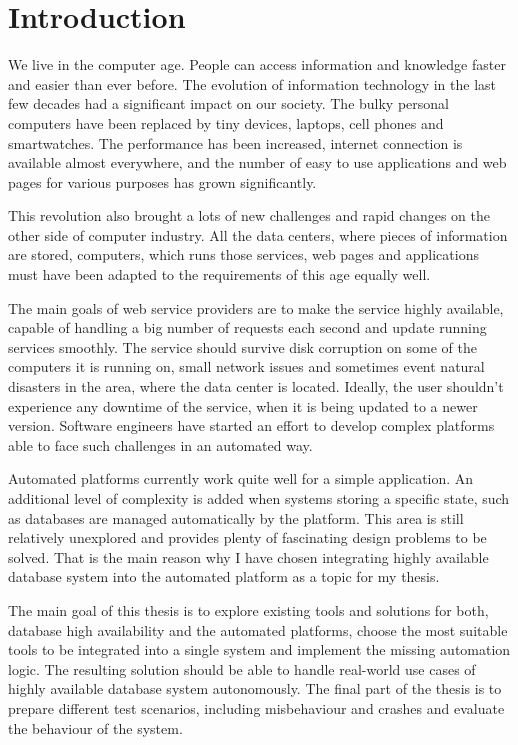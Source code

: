 \documentclass[
  digital, %
  twoside, %
  table,   %
  lof,     %
  lot,     %
]{fithesis3}
\begin{document}
\chapter{Introduction}
We live in the computer age. People can access information and knowledge faster and easier than ever before. The evolution of information technology in the last few decades had a significant impact on our society. The bulky personal computers have been replaced by tiny devices, laptops, cell phones and smartwatches. The performance has been increased, internet connection is available almost everywhere, and the number of easy to use applications and web pages for various purposes has grown significantly.

This revolution also brought a lots of new challenges and rapid changes on the other side of computer industry. All the data centers, where pieces of information are stored, computers, which runs those services, web pages and applications must have been adapted to the requirements of this age equally well.

The main goals of web service providers are to make the service highly available, capable of handling a big number of requests each second and update running services smoothly. The service should survive disk corruption on some of the computers it is running on, small network issues and sometimes event natural disasters in the area, where the data center is located. Ideally, the user shouldn't experience any downtime of the service, when it is being updated to a newer version. Software engineers have started an effort to develop complex platforms able to face such challenges in an automated way.

Automated platforms currently work quite well for a simple application. An additional level of complexity is added when systems storing a specific state, such as databases are managed automatically by the platform. This area is still relatively unexplored and provides plenty of fascinating design problems to be solved. That is the main reason why I have chosen integrating highly available database system into the automated platform as a topic for my thesis.

The main goal of this thesis is to explore existing tools and solutions for both, database high availability and the automated platforms, choose the most suitable tools to be integrated into a single system and implement the missing automation logic. The resulting solution should be able to handle real-world use cases of highly available database system autonomously. The final part of the thesis is to prepare different test scenarios, including misbehaviour and crashes and evaluate the behaviour of the system.
\end{document}
